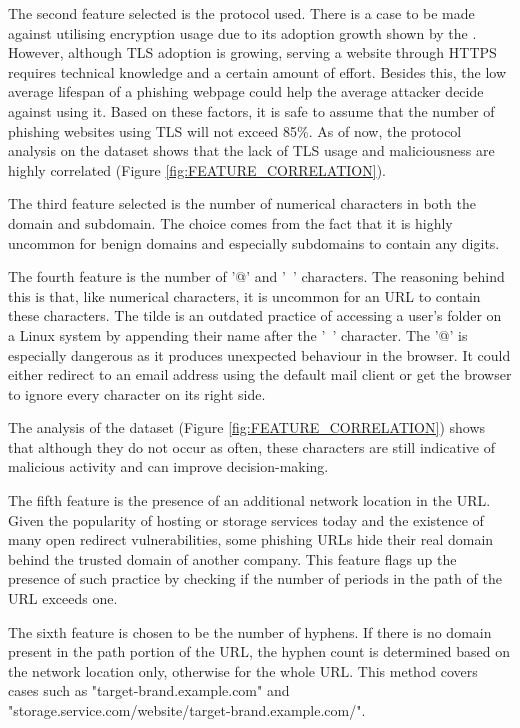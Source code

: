 The second feature selected is the protocol used. There is a case to be made against utilising encryption usage due to its adoption growth shown by the \cite{APWG_Q42019}. However, although TLS adoption is growing, serving a website through HTTPS requires technical knowledge and a certain amount of effort. Besides this, the low average lifespan of a phishing webpage could help the average attacker decide against using it. Based on these factors, it is safe to assume that the number of phishing websites using TLS will not exceed 85\%. As of now, the protocol analysis on the dataset shows that the lack of TLS usage and maliciousness are highly correlated (Figure \ref{fig:FEATURE_CORRELATION}).

The third feature selected is the number of numerical characters in both the domain and subdomain. The choice comes from the fact that it is highly uncommon for benign domains and especially subdomains to contain any digits.

The fourth feature is the number of '@' and '~' characters. The reasoning behind this is that, like numerical characters, it is uncommon for an URL to contain these characters. The tilde is an outdated practice of accessing a user's folder on a Linux system by appending their name after the '~' character.
The '@' is especially dangerous as it produces unexpected behaviour in the browser. It could either redirect to an email address using the default mail client or get the browser to ignore every character on its right side.

The analysis of the dataset (Figure \ref{fig:FEATURE_CORRELATION}) shows that although they do not occur as often, these characters are still indicative of malicious activity and can improve decision-making.

The fifth feature is the presence of an additional network location in the URL. Given the popularity of hosting or storage services today and the existence of many open redirect vulnerabilities, some phishing URLs hide their real domain behind the trusted domain of another company. This feature flags up the presence of such practice by checking if the number of periods in the path of the URL exceeds one.

The sixth feature is chosen to be the number of hyphens. If there is no domain present in the path portion of the URL, the hyphen count is determined based on the network location only, otherwise for the whole URL. This method covers cases such as "target-brand.example.com" and "storage.service.com/website/target-brand.example.com/".

